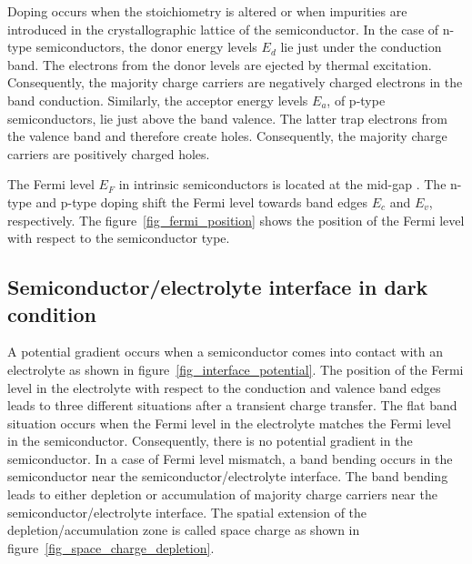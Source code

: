    Doping occurs when the stoichiometry is altered or when impurities are 
    introduced in the crystallographic lattice of the semiconductor. 
    In the case of n-type semiconductors, the donor energy levels $E_d$ lie just 
    under the conduction band. The electrons from the donor levels are ejected by 
    thermal excitation. 
    Consequently, the majority charge carriers are negatively charged electrons 
    in the band conduction. 
    Similarly, the acceptor energy levels $E_a$, of p-type semiconductors, 
    lie just above the band valence. 
    The latter trap electrons from the valence band and therefore create holes. 
    Consequently, the majority charge carriers are positively charged holes.

    

    The Fermi level $E_F$ in intrinsic semiconductors is located at the mid-gap . 
    The n-type and p-type doping shift the Fermi level towards band edges 
    $E_c$ and $E_v$, respectively. 
    The figure~\ref{fig_fermi_position} shows the position of the Fermi level 
    with respect to the semiconductor type. 

    



\subsection{Semiconductor/electrolyte interface in dark condition}
    A potential gradient occurs when a semiconductor comes into contact with an 
    electrolyte as shown in figure~\ref{fig_interface_potential}.
    The position of the Fermi level in the electrolyte with respect to the 
    conduction and valence band edges leads to three different situations after 
    a transient charge transfer. 
    The flat band situation occurs when the Fermi level in the electrolyte 
    matches the Fermi level in the semiconductor.  
    Consequently, there is no potential gradient in the semiconductor. 
    In a case of Fermi level mismatch, a band bending occurs in the semiconductor 
    near the semiconductor/electrolyte interface.  
    The band bending leads to either depletion or accumulation of majority 
    charge carriers near the semiconductor/electrolyte interface. 
    The spatial extension of the depletion/accumulation zone is called space 
    charge as shown in figure~\ref{fig_space_charge_depletion}. 

